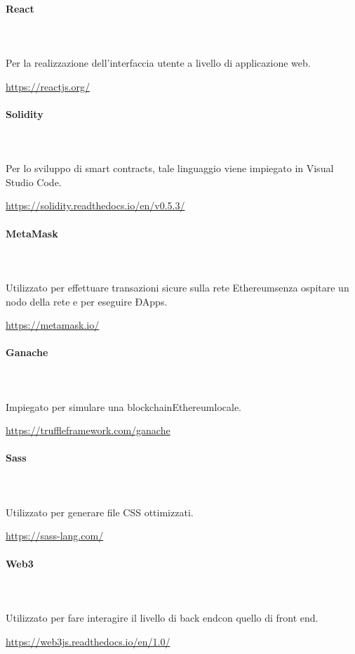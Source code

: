 \begin{itemize}
		\paragraph{React} \mbox{}\\ \mbox{}\\ 
		Per la realizzazione dell'interfaccia utente a livello di applicazione web.\newline
		\centerline{\url{https://reactjs.org/}}
		
		\paragraph{Solidity} \mbox{}\\ \mbox{}\\ 
		Per lo sviluppo di smart contracts\glo, tale linguaggio viene impiegato in Visual Studio Code.\newline
		\centerline{\url{https://solidity.readthedocs.io/en/v0.5.3/}}
		
		\paragraph{MetaMask} \mbox{}\\ \mbox{}\\ 
		Utilizzato per effettuare transazioni sicure sulla rete Ethereum\glosp senza ospitare un nodo della rete e per eseguire ÐApps\glo. \newline
		\centerline{\url{https://metamask.io/}}
		
		\paragraph{Ganache} \mbox{}\\ \mbox{}\\
		Impiegato per simulare una blockchain\glosp Ethereum\glosp locale.\\
		\centerline{\url{https://truffleframework.com/ganache}}
		
		\paragraph{Sass} \mbox{}\\ \mbox{}\\
		Utilizzato per generare file CSS ottimizzati.\\
		\centerline{\url{https://sass-lang.com/}}
		
		\paragraph{Web3} \mbox{}\\ \mbox{}\\
		Utilizzato per fare interagire il livello di back end\glosp con quello di front end\glo. \\
		\centerline{\url{https://web3js.readthedocs.io/en/1.0/}}
		

\end{itemize}
